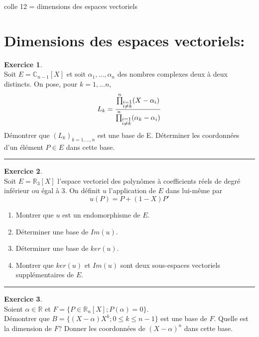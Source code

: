 \documentclass[a4paper,10pt]{article}
\theoremstyle{definition}
\theoremstyle{definition}
\newtheorem{exo}{Exercice}
\newcommand{\C}{\mathbb{C}}
\newcommand{\R}{\mathbb{R}}
\begin{document}
	
	
	\begin{center}
		\Large \sc colle 12 = dimensions des espaces vectoriels 
	\end{center}




\section*{Dimensions des espaces vectoriels:}
\begin{minipage}{1\linewidth}
	\begin{minipage}[t]{0.48\linewidth}
		\raggedright
		
		
		
		\begin{exo}\quad\\
		Soit $E = \C_{n-1}[X]$ 
			et soit $\alpha_1,...,\alpha_n$ des nombres complexes deux à deux distincts. On pose, pour $k= 1,...n$, 
			$$L_k = \dfrac{\prod\limits^{n}\mathop{}_{\mkern-5mu \substack{i=1\\i\neq k}}(X-\alpha_i)}{\prod\limits^{n}\mathop{}_{\mkern-5mu \substack{i=1\\i\neq k}}(\alpha_k-\alpha_i)}$$
			Démontrer que $(L_k)_{k=1,...,n}$ est une base de E. Déterminer les coordonnées d'un élément $P\in E$ dans cette base.
			
			\centering
			\rule{1\linewidth}{0.6pt}
		\end{exo}
	
		\begin{exo}\quad\\
			Soit $E=\R_3[X]$ l'espace vectoriel des polynômes à coefficients réels de degré inférieur ou égal à 3. On définit $u$ l'application de $E$ dans lui-même par $$u(P)=P+(1-X)P'$$
			\begin{enumerate}
				\item Montrer que $u$ est un endomorphisme de $E$. 
				\item Déterminer une base de $Im(u)$.
				\item Déterminer une base de $ker(u)$.
				\item Montrer que $ker(u)$
				et $Im(u)$ sont deux sous-espaces vectoriels supplémentaires de $E$. 
				
				
			\end{enumerate}
			
		\centering
		\rule{1\linewidth}{0.6pt}
	\end{exo}

	\begin{exo}\quad\\
	Soient $\alpha\in\R$ et $F=\{P\in \R_n[X] ; P(\alpha)=0\}$. \\[0.25cm] Démontrer que $B=\{(X-\alpha)X^k; 0\leq k \leq n-1\}$ est une base de $F$. Quelle est la dimension de $F$? Donner les coordonnées de $(X-\alpha)^n$ dans cette base.
	

\end{exo}
\end{minipage}
\end{minipage}
\end{document}
